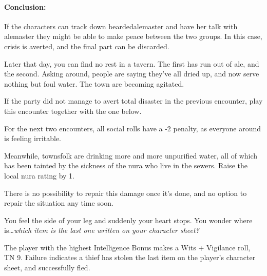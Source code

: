 \begin{multicols}{2}
\paragraph{Conclusion:} If the characters can track down \gls{beardedalemaster} and have her talk with \gls{alemaster} they might be able to make peace between the two groups.
In this case, crisis is averted, and the final part can be discarded.


\begin{boxtext}

	Later that day, you can find no rest in a tavern.  The first has run out of ale, and the second.  Asking around, people are saying they've all dried up, and now serve nothing but foul water.  The town are becoming agitated.

\end{boxtext}

If the party did not manage to avert total disaster in the previous encounter, play this encounter together with the one below.

For the next two encounters, all social rolls have a -2 penalty, as everyone around is feeling irritable.

Meanwhile, townsfolk are drinking more and more unpurified water, all of which has been tainted by the sickness of the nura who live in the sewers.  Raise the local nura rating by 1.

There is no possibility to repair this damage once it's done, and no option to repair the situation any time soon.

\stopcontents[sq]

\label{randommeetings}

\startcontents[sq]

\sqminitoc


\begin{boxtext}

	You feel the side of your leg and suddenly your heart stops.
	You wonder where is\ldots \textit{which item is the last one written on your character sheet?}

\end{boxtext}

The player with the highest Intelligence Bonus makes a Wits + Vigilance roll, TN 9.
Failure indicates a thief has stolen the last item on the player's character sheet, and successfully fled.


\end{multicols}
